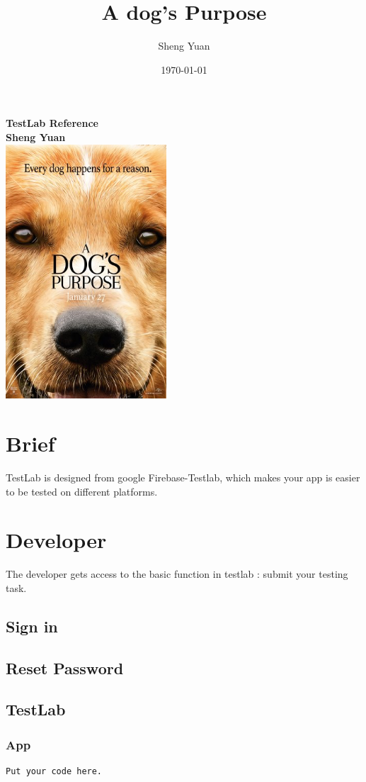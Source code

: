 \documentclass{paper}
\title{A dog's Purpose}
\author{Sheng Yuan}
\date{\today}
\begin{document}
\begin{titlepage}
	\centering
	\vfill
	{\bfseries\Huge
		TestLab Reference\\
		\vskip2cm
		\Large
		Sheng Yuan\\
	}
	\vfill
	\includegraphics[width=6cm]{poster.jpg} %
	\vfill
	\vfill
\end{titlepage}

\tableofcontents

\section{Brief}
	TestLab is designed from google Firebase-Testlab, which makes your app is easier to be tested on different platforms. 
	
\section{Developer}
The developer gets access to the basic function in testlab : submit your testing task.
\subsection{Sign in}
\subsection{Reset Password}
\subsection{TestLab}

\subsubsection{App}
\begin{lstlisting}
Put your code here.
\end{lstlisting}
\end{document}
